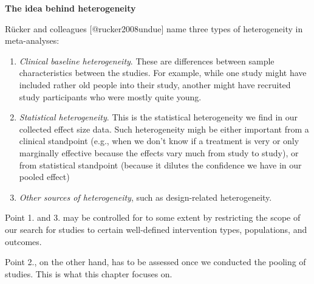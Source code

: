 \documentclass[]{book}
\providecommand{\tightlist}{%
  \setlength{\itemsep}{0pt}\setlength{\parskip}{0pt}}
\begin{document}
\begin{rmdinfo}
\textbf{The idea behind heterogeneity}

Rücker and colleagues {[}@rucker2008undue{]} name three types of
heterogeneity in meta-analyses:

\begin{enumerate}
\def\labelenumi{\arabic{enumi}.}
\tightlist
\item
  \emph{Clinical baseline heterogeneity}. These are differences between
  sample characteristics between the studies. For example, while one
  study might have included rather old people into their study, another
  might have recruited study participants who were mostly quite young.
\item
  \emph{Statistical heterogeneity}. This is the statistical
  heterogeneity we find in our collected effect size data. Such
  heterogeneity migh be either important from a clinical standpoint
  (e.g., when we don't know if a treatment is very or only marginally
  effective because the effects vary much from study to study), or from
  statistical standpoint (because it dilutes the confidence we have in
  our pooled effect)
\item
  \emph{Other sources of heterogeneity}, such as design-related
  heterogeneity.
\end{enumerate}

Point 1. and 3. may be controlled for to some extent by restricting the
scope of our search for studies to certain well-defined intervention
types, populations, and outcomes.

Point 2., on the other hand, has to be assessed once we conducted the
pooling of studies. This is what this chapter focuses on.
\end{rmdinfo}
\end{document}
